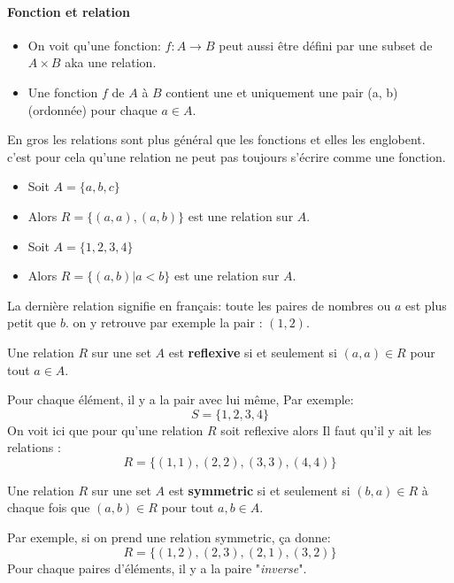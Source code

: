 \paragraph{Fonction et relation}
\begin{itemize}
    \item On voit qu'une fonction: $f : A \to B$ peut aussi être défini par une subset de $A \times B$ aka une relation.
    \item Une fonction $f$ de $A$ à $B$ contient une et uniquement une pair (a, b) (ordonnée) pour chaque $a \in A$.
\end{itemize}
En gros les relations sont plus général que les fonctions et elles les englobent. c'est pour cela qu'une relation ne peut pas toujours s'écrire comme une fonction.
\begin{itemize}
    \item Soit $A = \{a, b, c\}$
    \item Alors $R = \{(a, a), (a, b)\}$ est une relation sur $A$.
    \item Soit $A= \{1, 2, 3, 4\}$
    \item Alors $R = \{(a, b) | a < b\}$ est une relation sur $A$.
\end{itemize}

La dernière relation signifie en français: toute les paires de nombres ou $a$ est plus petit que $b$. on y retrouve par exemple la pair : $(1, 2)$.

\begin{definition}[Reflexive]
    Une relation $R$ sur une set $A$ est \textbf{reflexive} si et seulement si $(a, a) \in R$ pour tout $a \in A$.
\end{definition}
Pour chaque élément, il y a la pair avec lui même, Par exemple: 
\begin{equation*}
    S =  \{ 1, 2, 3, 4\}
\end{equation*}
On voit ici que pour qu'une relation $R$ soit reflexive alors Il faut qu'il y ait les relations : 
\begin{equation*}
    R = \{(1, 1), (2, 2), (3, 3), (4, 4)\}
\end{equation*}
\hspace{0.4cm}

\begin{definition}[Symmetric]
    Une relation $R$ sur une set $A$ est \textbf{symmetric} si et seulement si $(b, a) \in R$ à chaque fois que $(a, b) \in R$ pour tout $a, b \in A$.
\end{definition}
Par exemple, si on prend une relation symmetric, ça donne:
\begin{equation*}
    R = \{(1, 2), (2, 3), (2, 1), (3, 2)\}
\end{equation*}
Pour chaque paires d'éléments, il y a la paire "\textit{inverse}".

